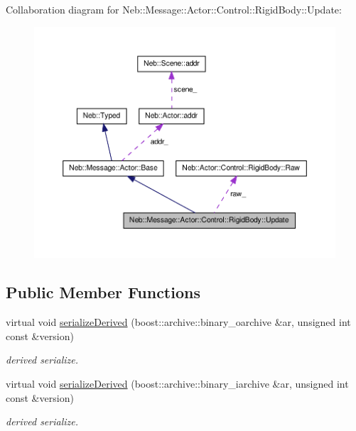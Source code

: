 \-Collaboration diagram for \-Neb\-:\-:\-Message\-:\-:\-Actor\-:\-:\-Control\-:\-:\-Rigid\-Body\-:\-:\-Update\-:
\nopagebreak
\begin{figure}[H]
\begin{center}
\leavevmode
\includegraphics[width=350pt]{classNeb_1_1Message_1_1Actor_1_1Control_1_1RigidBody_1_1Update__coll__graph}
\end{center}
\end{figure}
\subsection*{\-Public \-Member \-Functions}
\begin{DoxyCompactItemize}
\item 
\hypertarget{classNeb_1_1Message_1_1Actor_1_1Control_1_1RigidBody_1_1Update_af4e2d2488ccc9bcf7c6589ccb06d1fef}{virtual void \hyperlink{classNeb_1_1Message_1_1Actor_1_1Control_1_1RigidBody_1_1Update_af4e2d2488ccc9bcf7c6589ccb06d1fef}{serialize\-Derived} (boost\-::archive\-::binary\-\_\-oarchive \&ar, unsigned int const \&version)}\label{classNeb_1_1Message_1_1Actor_1_1Control_1_1RigidBody_1_1Update_af4e2d2488ccc9bcf7c6589ccb06d1fef}

\begin{DoxyCompactList}\small\item\em derived serialize. \end{DoxyCompactList}\item 
\hypertarget{classNeb_1_1Message_1_1Actor_1_1Control_1_1RigidBody_1_1Update_a5008295bad96c1675dfe86b3220f8e62}{virtual void \hyperlink{classNeb_1_1Message_1_1Actor_1_1Control_1_1RigidBody_1_1Update_a5008295bad96c1675dfe86b3220f8e62}{serialize\-Derived} (boost\-::archive\-::binary\-\_\-iarchive \&ar, unsigned int const \&version)}\label{classNeb_1_1Message_1_1Actor_1_1Control_1_1RigidBody_1_1Update_a5008295bad96c1675dfe86b3220f8e62}

\begin{DoxyCompactList}\small\item\em derived serialize. \end{DoxyCompactList}\end{DoxyCompactItemize}
